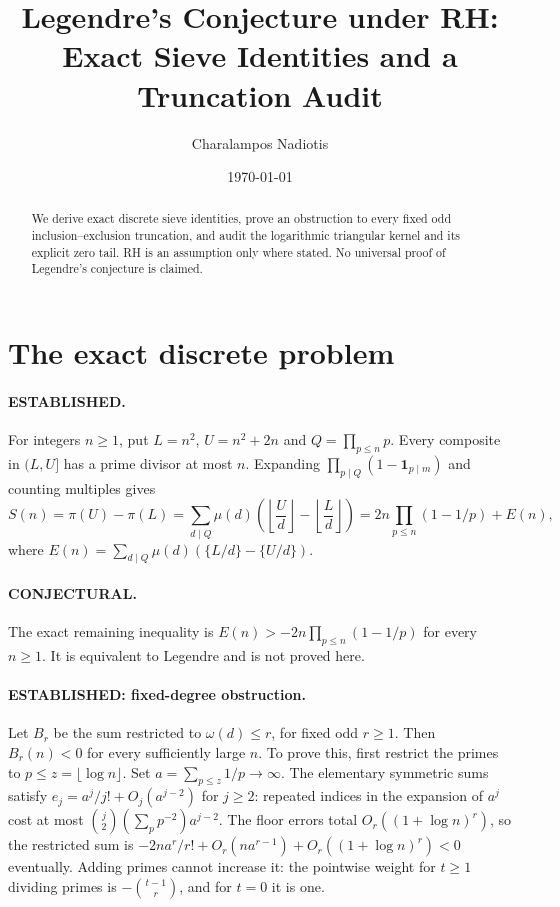 \documentclass[11pt]{article}
\title{Legendre's Conjecture under RH:\\Exact Sieve Identities and a Truncation Audit}
\author{Charalampos Nadiotis}
\date{\today}
\begin{document}
\maketitle

\begin{abstract}
We derive exact discrete sieve identities, prove an obstruction to every
fixed odd inclusion--exclusion truncation, and audit the logarithmic
triangular kernel and its explicit zero tail. RH is an assumption only
where stated. No universal proof of Legendre's conjecture is claimed.
\end{abstract}

\section{The exact discrete problem}
\paragraph{ESTABLISHED.}
For integers $n\ge1$, put $L=n^2$, $U=n^2+2n$ and $Q=\prod_{p\le n}p$.
Every composite in $(L,U]$ has a prime divisor at most $n$.
Expanding $\prod_{p\mid Q}(1-\mathbf1_{p\mid m})$ and counting multiples gives
\[
S(n)=\pi(U)-\pi(L)=\sum_{d\mid Q}\mu(d)
 \left(\left\lfloor\frac Ud\right\rfloor-\left\lfloor\frac Ld\right\rfloor\right)
=2n\prod_{p\le n}(1-1/p)+E(n),
\]
where $E(n)=\sum_{d\mid Q}\mu(d)(\{L/d\}-\{U/d\})$.
\paragraph{CONJECTURAL.}
The exact remaining inequality is $E(n)>-2n\prod_{p\le n}(1-1/p)$ for every
$n\ge1$. It is equivalent to Legendre and is not proved here.

\paragraph{ESTABLISHED: fixed-degree obstruction.}
Let $B_r$ be the sum restricted to $\omega(d)\le r$, for fixed odd $r\ge1$.
Then $B_r(n)<0$ for every sufficiently large $n$.
To prove this, first restrict the primes to $p\le z=\lfloor\log n\rfloor$.
Set $a=\sum_{p\le z}1/p\to\infty$. The elementary symmetric sums satisfy
$e_j=a^j/j!+O_j(a^{j-2})$ for $j\ge2$: repeated indices in the expansion
of $a^j$ cost at most $\binom j2(\sum_p p^{-2})a^{j-2}$.
The floor errors total $O_r((1+\log n)^r)$, so the restricted sum is
$-2na^r/r!+O_r(na^{r-1})+O_r((1+\log n)^r)<0$ eventually.
Adding primes cannot increase it: the pointwise weight for $t\ge1$
dividing primes is $-\binom{t-1}{r}$, and for $t=0$ it is one.
\end{document}
